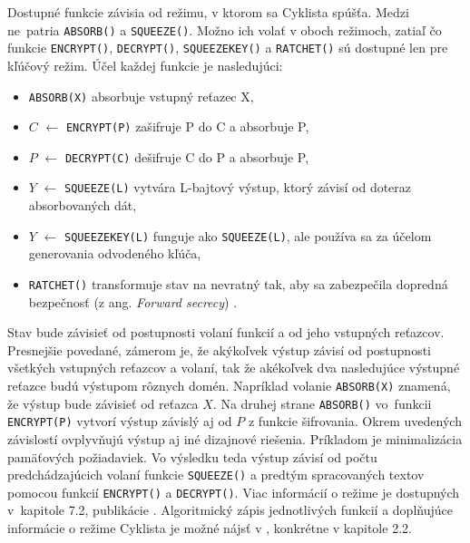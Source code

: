 Dostupné funkcie závisia od režimu, v ktorom sa  Cyklista spúšťa. Medzi ne~patria \lstinline|ABSORB()| a \lstinline|SQUEEZE()|. Možno ich volať v oboch režimoch, zatiaľ čo funkcie \lstinline|ENCRYPT()|, \lstinline|DECRYPT()|, \lstinline|SQUEEZEKEY()| a \lstinline|RATCHET()| sú dostupné len pre kľúčový režim. Účel každej funkcie je nasledujúci:
\begin{itemize}
	\item \lstinline|ABSORB(X)| absorbuje vstupný reťazec X,
	\item $C$ $\gets$ \lstinline|ENCRYPT(P)| zašifruje P do C a absorbuje P,
	\item $P$ $\gets$ \lstinline|DECRYPT(C)| dešifruje C do P a absorbuje P,
	\item $Y$ $\gets$	\lstinline|SQUEEZE(L)|  vytvára L-bajtový výstup, ktorý závisí od doteraz absorbovaných dát,
	\item $Y$ $\gets$	\lstinline|SQUEEZEKEY(L)| funguje ako \lstinline|SQUEEZE(L)|, ale používa sa za účelom generovania odvodeného kľúča,
	\item \lstinline|RATCHET()| transformuje stav na nevratný tak, aby sa zabezpečila dopredná bezpečnosť (z ang. \textit{Forward secrecy}) \cite{fsec}. 
\end{itemize}

Stav bude závisieť od postupnosti volaní funkcií a od jeho vstupných reťazcov. Presnejšie povedané, zámerom je, že akýkoľvek výstup závisí od postupnosti všetkých vstupných reťazcov a volaní, tak že akékoľvek dva nasledujúce výstupné reťazce budú výstupom rôznych domén. Napríklad volanie \lstinline|ABSORB(X)| znamená, že výstup bude závisieť od reťazca $X$. Na druhej strane \lstinline|ABSORB()| vo~funkcii \\\lstinline|ENCRYPT(P)| vytvorí výstup závislý aj od $P$ z funkcie šifrovania. Okrem uvedených závislostí ovplyvňujú výstup aj iné dizajnové riešenia. Príkladom je minimalizácia pamäťových požiadaviek. Vo výsledku teda výstup závisí od počtu predchádzajúcich volaní funkcie \lstinline|SQUEEZE()| a predtým spracovaných textov pomocou funkcií \lstinline|ENCRYPT()| a \lstinline|DECRYPT()|. Viac informácií o režime je dostupných v~kapitole 7.2, publikácie \cite{xcb}.
Algoritmický zápis jednotlivých funkcií a doplňujúce informácie o režime Cyklista je možné nájsť v \cite{xdr2}, konkrétne v kapitole 2.2. 


